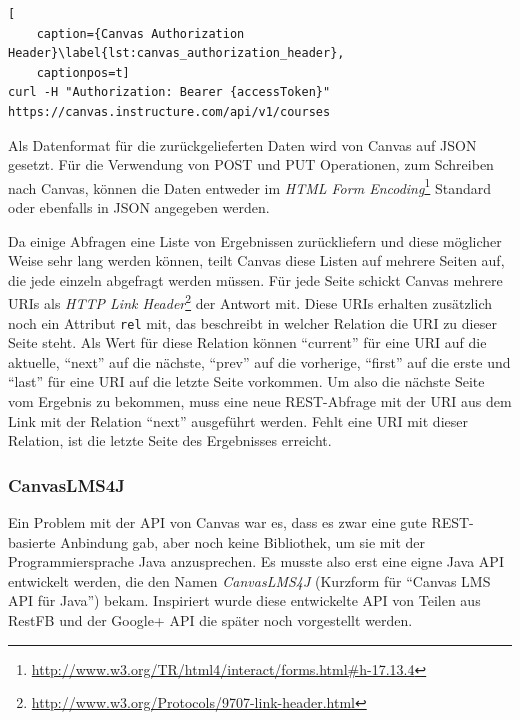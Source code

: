 \begin{lstlisting}[
    caption={Canvas Authorization Header}\label{lst:canvas_authorization_header},
    captionpos=t]
curl -H "Authorization: Bearer {accessToken}" https://canvas.instructure.com/api/v1/courses
\end{lstlisting}

Als Datenformat für die zurückgelieferten Daten wird von Canvas auf JSON gesetzt. Für die Verwendung von POST und PUT Operationen, zum Schreiben nach Canvas, können die Daten entweder im \emph{HTML Form Encoding}\footnote{\url{http://www.w3.org/TR/html4/interact/forms.html\#h-17.13.4}} Standard oder ebenfalls in JSON angegeben werden. 

Da einige Abfragen eine Liste von Ergebnissen zurückliefern und diese möglicher Weise sehr lang werden können, teilt Canvas diese Listen auf mehrere Seiten auf, die jede einzeln abgefragt werden müssen. Für jede Seite schickt Canvas mehrere URIs als \emph{HTTP Link Header}\footnote{\url{http://www.w3.org/Protocols/9707-link-header.html}} der Antwort mit. Diese URIs erhalten zusätzlich noch ein Attribut \texttt{rel} mit, das beschreibt in welcher Relation die URI zu dieser Seite steht.  Als Wert für diese Relation können \enquote{current} für eine URI auf die aktuelle, \enquote{next} auf die nächste, \enquote{prev} auf die vorherige, \enquote{first} auf die erste und \enquote{last} für eine URI auf die letzte Seite vorkommen. Um also die nächste Seite vom Ergebnis zu bekommen, muss eine neue REST-Abfrage mit der URI aus dem Link mit der Relation \enquote{next} ausgeführt werden. Fehlt eine URI mit dieser Relation, ist die letzte Seite des Ergebnisses erreicht. 


\subsubsection{CanvasLMS4J} %
\label{ssub:canvaslms4j}

Ein Problem mit der API von Canvas war es, dass es zwar eine gute REST-basierte Anbindung gab, aber noch keine Bibliothek, um sie mit der Programmiersprache Java anzusprechen. Es musste also erst eine eigne Java API  entwickelt werden, die den Namen \emph{CanvasLMS4J} (Kurzform für \enquote{Canvas LMS API für Java}) bekam. Inspiriert wurde diese entwickelte API von Teilen aus RestFB und der Google+ API die später noch vorgestellt werden.

